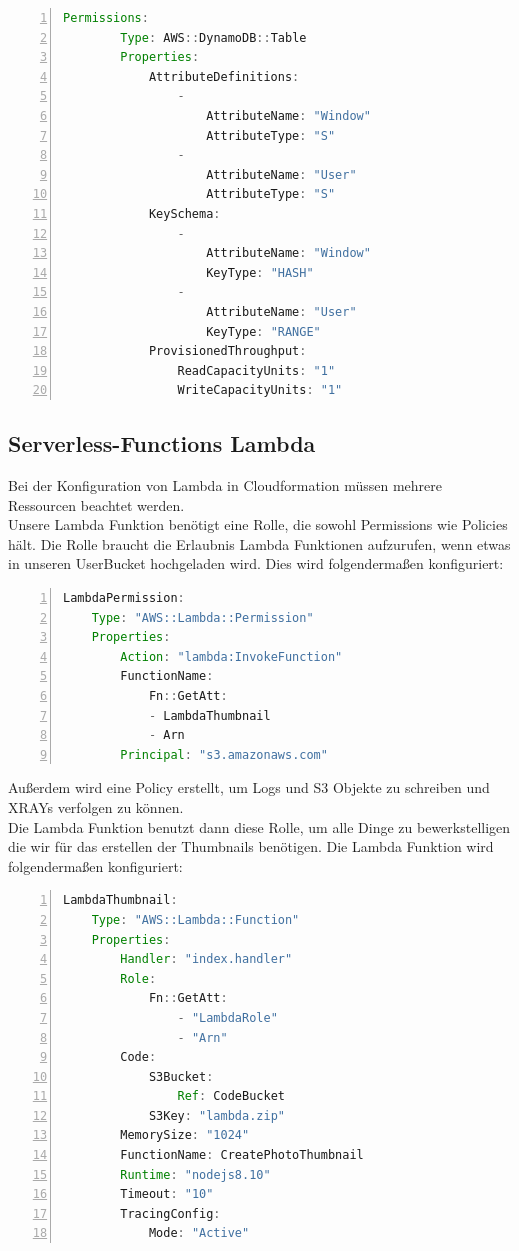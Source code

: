 \documentclass[a4paper, 12pt]{scrreprt}
\renewcommand\_{\textunderscore\allowbreak}
\begin{document}
\begin{lstlisting}[xleftmargin=\parindent,numbers=left,numberstyle=\small,numbersep=8pt,frame=L,mathescape=true, basicstyle=\small, language=Java, lineskip={1.0pt}]
Permissions:
        Type: AWS::DynamoDB::Table
        Properties:
            AttributeDefinitions:
                -
                    AttributeName: "Window"
                    AttributeType: "S"
                -
                    AttributeName: "User"
                    AttributeType: "S"
            KeySchema:
                -
                    AttributeName: "Window"
                    KeyType: "HASH"
                -
                    AttributeName: "User"
                    KeyType: "RANGE"
            ProvisionedThroughput:
                ReadCapacityUnits: "1"
                WriteCapacityUnits: "1"
\end{lstlisting}



\subsection{Serverless-Functions Lambda}
Bei der Konfiguration von Lambda in Cloudformation müssen mehrere Ressourcen beachtet werden. \\
Unsere Lambda Funktion benötigt eine Rolle, die sowohl Permissions wie Policies hält. Die Rolle braucht die Erlaubnis Lambda Funktionen aufzurufen, wenn etwas in unseren UserBucket hochgeladen wird. Dies wird folgendermaßen konfiguriert:

\begin{lstlisting}[xleftmargin=\parindent,numbers=left,numberstyle=\small,numbersep=8pt,frame=L,mathescape=true, basicstyle=\small, language=Java, lineskip={1.0pt}]
LambdaPermission:
    Type: "AWS::Lambda::Permission"
    Properties: 
        Action: "lambda:InvokeFunction"
        FunctionName:
            Fn::GetAtt:
            - LambdaThumbnail
            - Arn
        Principal: "s3.amazonaws.com"
\end{lstlisting}

Außerdem wird eine Policy erstellt, um Logs und S3 Objekte zu schreiben und XRAYs verfolgen zu können.\\
Die Lambda Funktion benutzt dann diese Rolle, um alle Dinge zu bewerkstelligen die wir für das erstellen der Thumbnails benötigen. Die Lambda Funktion wird folgendermaßen konfiguriert:

\begin{lstlisting}[xleftmargin=\parindent,numbers=left,numberstyle=\small,numbersep=8pt,frame=L,mathescape=true, basicstyle=\small, language=Java, lineskip={1.0pt}]
LambdaThumbnail:
    Type: "AWS::Lambda::Function"
    Properties: 
        Handler: "index.handler"
        Role: 
            Fn::GetAtt: 
                - "LambdaRole"
                - "Arn"
        Code:
            S3Bucket:
                Ref: CodeBucket
            S3Key: "lambda.zip"
        MemorySize: "1024"
        FunctionName: CreatePhotoThumbnail
        Runtime: "nodejs8.10"
        Timeout: "10"
        TracingConfig:
            Mode: "Active"
\end{lstlisting}
\end{document}
